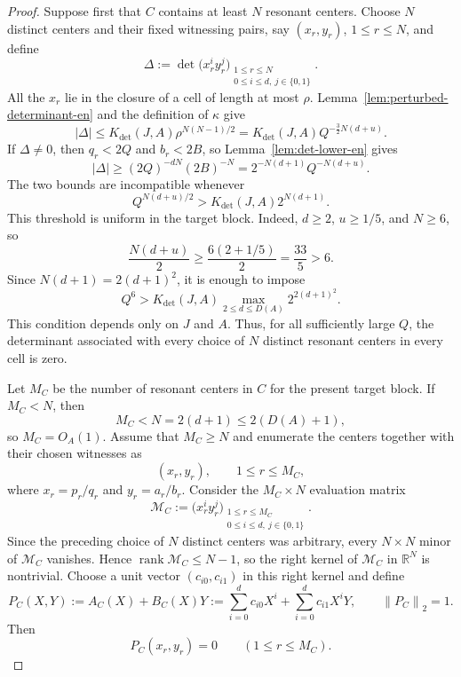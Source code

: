 \documentclass[11pt]{amsart}
\numberwithin{equation}{section}
\theoremstyle{definition}
\theoremstyle{remark}
\newcommand{\R}{\mathbb R}
\newcommand{\rank}{\operatorname{rank}}
\newcommand{\norm}[1]{\left\lVert #1\right\rVert}
\begin{document}
\begin{proof}
Suppose first that $C$ contains at least $N$ resonant centers. Choose
$N$ distinct centers and their fixed witnessing pairs, say
$(x_r,y_r)$, $1\leq r\leq N$, and define
\[
\Delta
:=
\det\bigl(x_r^iy_r^j\bigr)_{
\substack{1\leq r\leq N\\0\leq i\leq d,\ j\in\{0,1\}}}.
\]
All the $x_r$ lie in the closure of a cell of length at most $\rho$.
Lemma~\ref{lem:perturbed-determinant-en} and the definition of
$\kappa$ give
\begin{equation}\label{eq:det-upper-high-en}
|\Delta|
\leq
K_{\det}(J,A)\rho^{N(N-1)/2}
=
K_{\det}(J,A)Q^{-\frac32N(d+u)}.
\end{equation}
If $\Delta\neq0$, then $q_r<2Q$ and $b_r<2B$, so
Lemma~\ref{lem:det-lower-en} gives
\begin{equation}\label{eq:det-lower-high-en}
|\Delta|
\geq
(2Q)^{-dN}(2B)^{-N}
=
2^{-N(d+1)}Q^{-N(d+u)}.
\end{equation}
The two bounds are incompatible whenever
\begin{equation}\label{eq:det-incompatibility-en}
Q^{N(d+u)/2}
>
K_{\det}(J,A)2^{N(d+1)}.
\end{equation}
This threshold is uniform in the target block. Indeed,
$d\geq2$, $u\geq1/5$, and $N\geq6$, so
\[
\frac{N(d+u)}{2}
\geq\frac{6(2+1/5)}{2}
=\frac{33}{5}>6.
\]
Since $N(d+1)=2(d+1)^2$, it is enough to impose
\[
Q^6
>
K_{\det}(J,A)
\max_{2\leq d\leq D(A)}2^{2(d+1)^2}.
\]
This condition depends only on $J$ and $A$. Thus, for all sufficiently
large $Q$, the determinant associated with every choice of $N$
distinct resonant centers in every cell is zero.

Let $M_C$ be the number of resonant centers in $C$ for the present
target block. If $M_C<N$, then
\[
M_C<N=2(d+1)\leq2(D(A)+1),
\]
so $M_C=O_A(1)$. Assume that $M_C\ge N$ and enumerate the centers together with their
chosen witnesses as
\[
(x_r,y_r),\qquad 1\le r\le M_C,
\]
where $x_r=p_r/q_r$ and $y_r=a_r/b_r$. Consider the $M_C\times N$ evaluation matrix
\begin{equation}\label{eq:evaluation-matrix-en}
\mathcal M_C
:=
\bigl(x_r^iy_r^j\bigr)_{
\substack{1\leq r\leq M_C\\0\leq i\leq d,\ j\in\{0,1\}}}.
\end{equation}
Since the preceding choice of $N$ distinct centers was arbitrary, every
$N\times N$ minor of $\mathcal M_C$ vanishes. Hence
$\rank\mathcal M_C\leq N-1$, so the right kernel of $\mathcal M_C$ in
$\R^N$ is nontrivial. Choose a unit vector $(c_{i0},c_{i1})$ in this
right kernel and define
\begin{equation}\label{eq:auxiliary-polynomial-en}
P_C(X,Y)
:=
A_C(X)+B_C(X)Y
:=
\sum_{i=0}^dc_{i0}X^i
+
\sum_{i=0}^dc_{i1}X^iY,
\qquad
\norm{P_C}_2=1.
\end{equation}
Then
\begin{equation}\label{eq:P-vanishes-pairs-en}
P_C(x_r,y_r)=0
\qquad(1\leq r\leq M_C).
\end{equation}


\end{proof}
\end{document}
